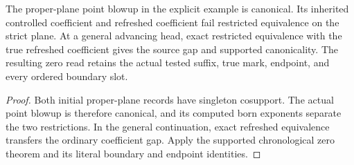 \begin{theorem}
\label{hir:g1-exact-refreshed-zero-continuation}
\leanok
The proper-plane point blowup in the explicit example is canonical.
Its inherited controlled coefficient and refreshed coefficient fail
restricted equivalence on the strict plane. At a general advancing
head, exact restricted equivalence with the true refreshed
coefficient gives the source gap and supported canonicality. The
resulting zero read retains the actual tested suffix, true mark,
endpoint, and every ordered boundary slot.
\end{theorem}
\begin{proof}
Both initial proper-plane records have singleton cosupport. The
actual point blowup is therefore canonical, and its computed born
exponents separate the two restrictions. In the general
continuation, exact refreshed equivalence transfers the ordinary
coefficient gap. Apply the supported chronological zero theorem
and its literal boundary and endpoint identities.
\end{proof}

